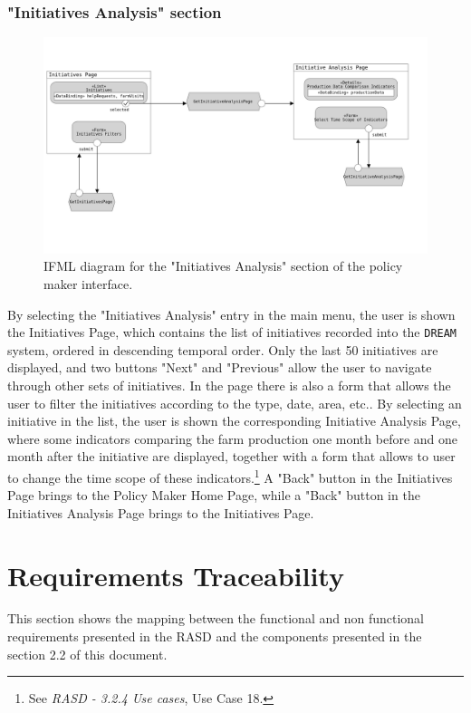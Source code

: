 \documentclass{article}
\begin{document}
\subsubsection{"Initiatives Analysis" section}
\begin{figure}[H]
    \centering
     \includegraphics[scale=0.17]{diagrams/ui diagrams/policymaker/initiatives analysis.png} 
    \caption{IFML diagram for the "Initiatives Analysis" section of the policy maker interface.}
\end{figure}
By selecting the "Initiatives Analysis" entry in the main menu, the user is shown the Initiatives Page, which contains the list of initiatives recorded into the \verb|DREAM| system, ordered in descending temporal order. Only the last 50 initiatives are displayed, and two buttons "Next" and "Previous" allow the user to navigate through other sets of initiatives. In the page there is also a form that allows the user to filter the initiatives according to the type, date, area, etc.. \newline
By selecting an initiative in the list, the user is shown the corresponding Initiative Analysis Page, where some indicators comparing the farm production one month before and one month after the initiative are displayed, together with a form that allows to user to change the time scope of these indicators.\footnote{See \textit{RASD - 3.2.4 Use cases}, Use Case 18.} \newline
A "Back" button in the Initiatives Page brings to the Policy Maker Home Page, while a "Back" button in the Initiatives Analysis Page brings to the Initiatives Page.

\newpage
\section{Requirements Traceability}
This section shows the mapping between the functional and non functional requirements presented in the RASD and the components presented in the section  2.2 of this document.
\end{document}
